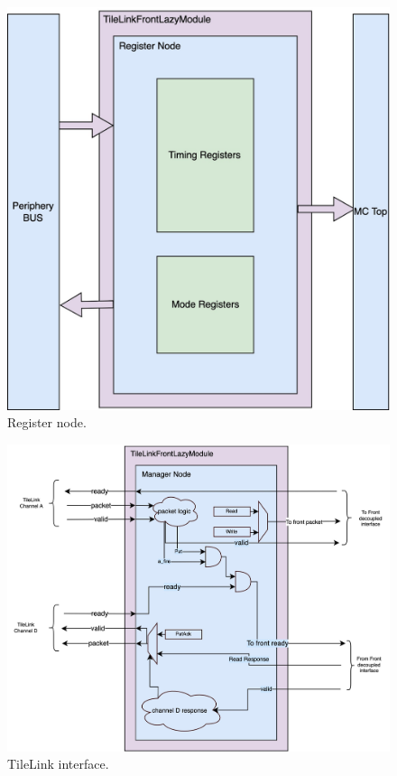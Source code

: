 \begin{figure}
    \centering
    \includegraphics[scale=0.1]{images/reg-node.jpg}
    \caption{Register node.}
    \label{fig:reg-node}
\end{figure}
\begin{figure}
    \centering
    \includegraphics[scale=0.18]{images/tl-front.jpg}
    \caption{TileLink interface.}
    \label{fig:tli}
\end{figure}

